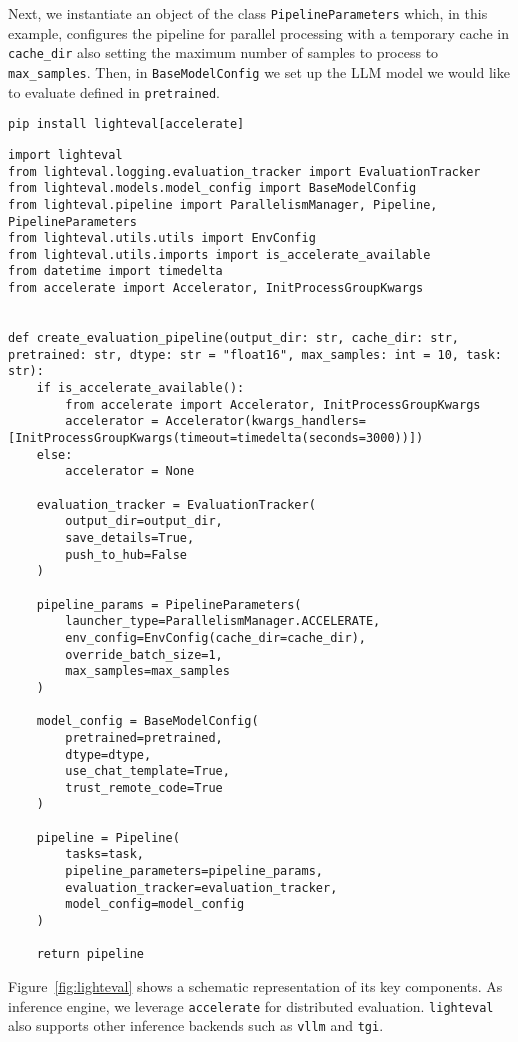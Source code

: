 Next, we instantiate an object of the class \texttt{PipelineParameters} which, in this example, configures the pipeline for parallel processing with a temporary cache in \texttt{cache\_dir} also setting the maximum number of samples to process to \texttt{max\_samples}. Then, in \texttt{BaseModelConfig} we set up the LLM model we would like to evaluate defined in \texttt{pretrained}.

\begin{verbatim}
pip install lighteval[accelerate]
\end{verbatim}
\begin{verbatim}
import lighteval
from lighteval.logging.evaluation_tracker import EvaluationTracker
from lighteval.models.model_config import BaseModelConfig
from lighteval.pipeline import ParallelismManager, Pipeline, PipelineParameters
from lighteval.utils.utils import EnvConfig
from lighteval.utils.imports import is_accelerate_available
from datetime import timedelta
from accelerate import Accelerator, InitProcessGroupKwargs


def create_evaluation_pipeline(output_dir: str, cache_dir: str, pretrained: str, dtype: str = "float16", max_samples: int = 10, task: str):
    if is_accelerate_available():
        from accelerate import Accelerator, InitProcessGroupKwargs
        accelerator = Accelerator(kwargs_handlers=[InitProcessGroupKwargs(timeout=timedelta(seconds=3000))])
    else:
        accelerator = None

    evaluation_tracker = EvaluationTracker(
        output_dir=output_dir,
        save_details=True,
        push_to_hub=False  
    )

    pipeline_params = PipelineParameters(
        launcher_type=ParallelismManager.ACCELERATE,
        env_config=EnvConfig(cache_dir=cache_dir),
        override_batch_size=1,
        max_samples=max_samples
    )

    model_config = BaseModelConfig(
        pretrained=pretrained,
        dtype=dtype,
        use_chat_template=True,
        trust_remote_code=True
    )

    pipeline = Pipeline(
        tasks=task,
        pipeline_parameters=pipeline_params,
        evaluation_tracker=evaluation_tracker,
        model_config=model_config
    )
    
    return pipeline
\end{verbatim}
Figure~\ref{fig:lighteval} shows a schematic representation of its key components. As inference engine, we leverage \texttt{accelerate} for distributed evaluation. \texttt{lighteval} also supports other inference backends such as \texttt{vllm} and \texttt{tgi}.

